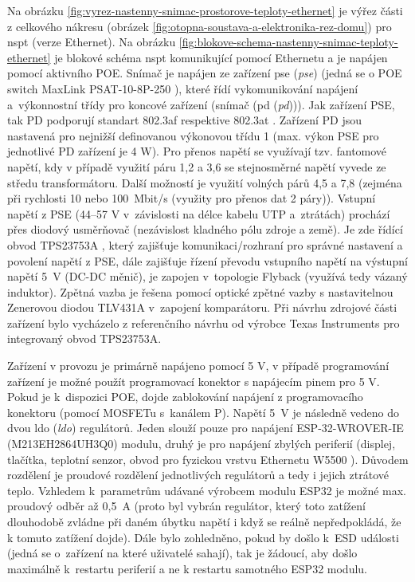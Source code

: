 Na obrázku \ref{fig:vyrez-nastenny-snimac-prostorove-teploty-ethernet} je výřez části z celkového nákresu (obrázek \ref{fig:otopna-soustava-a-elektronika-rez-domu}) pro \acrshort{nspt} (verze Ethernet). Na obrázku \ref{fig:blokove-schema-nastenny-snimac-teploty-ethernet} je blokové schéma \acrshort{nspt} komunikující pomocí Ethernetu a je napájen pomocí aktivního POE. Snímač je napájen ze zařízení \acrshort{pse} (\textit{\acrlong{pse}}) (jedná se o POE switch MaxLink PSAT-10-8P-250 \cite{maxlink-psat-10-8p-250}), které řídí vykomunikování napájení a~výkonnostní třídy pro koncové zařízení (snímač (\acrshort{pd} (\textit{\acrlong{pd}}))). Jak zařízení PSE, tak PD podporují standart 802.3af \cite{norma-802.3af} respektive 802.3at \cite{norma-802.3at}. Zařízení PD jsou nastavená pro nejnižší definovanou výkonovou třídu 1 (max. výkon PSE pro jednotlivé PD zařízení je 4 W). Pro přenos napětí se využívají tzv. fantomové napětí, kdy v případě využití páru 1,2 a 3,6 se stejnosměrné napětí vyvede ze středu transformátoru. Další možností je využití volných párů 4,5 a 7,8 (zejména při rychlosti 10 nebo 100~Mbit/s (využity pro přenos dat 2 páry)). Vstupní napětí z PSE (44–57 V v~závislosti na délce kabelu UTP a~ztrátách) prochází přes diodový usměrňovač (nezávislost kladného pólu zdroje a země). Je zde řídící obvod TPS23753A \cite{tps23753a}, který zajišťuje komunikaci/rozhraní pro správné nastavení a povolení napětí z PSE, dále zajišťuje řízení převodu vstupního napětí na výstupní napětí 5~V (DC-DC měnič), je zapojen v~topologie Flyback (využívá tedy vázaný induktor). Zpětná vazba je řešena pomocí optické zpětné vazby s nastavitelnou Zenerovou diodou TLV431A \cite{tlv431a} v~zapojení komparátoru. Při návrhu zdrojové části zařízení bylo vycházelo z referenčního návrhu od výrobce Texas Instruments pro integrovaný obvod TPS23753A.

Zařízení v provozu je primárně  napájeno pomocí 5 V, v případě programování zařízení je možné použít programovací konektor s napájecím pinem pro 5 V. Pokud je k~dispozici POE, dojde zablokování napájení z programovacího konektoru (pomocí MOSFETu s~kanálem P). Napětí 5~V je následně vedeno do dvou \acrshort{ldo} (\textit{\acrlong{ldo}}) regulátorů. Jeden slouží pouze pro napájení ESP-32-WROVER-IE (M213EH2864UH3Q0) \cite{esp32-wrover-ie} modulu, druhý je pro napájení zbylých periferií (displej, tlačítka, teplotní senzor, obvod pro fyzickou vrstvu Ethernetu W5500 \cite{w5500}). Důvodem rozdělení je proudové rozdělení jednotlivých regulátorů a tedy i jejich ztrátové teplo. Vzhledem k~parametrům udávané výrobcem modulu ESP32 je možné max. proudový odběr až 0,5~A (proto byl vybrán regulátor, který toto zatížení dlouhodobě zvládne při daném úbytku napětí i když se reálně nepředpokládá, že k tomuto zatížení dojde). Dále bylo zohledněno, pokud by došlo k~ESD události (jedná se o~zařízení na které uživatelé sahají), tak je žádoucí, aby došlo maximálně k~restartu periferií a ne k restartu samotného ESP32 modulu. 

